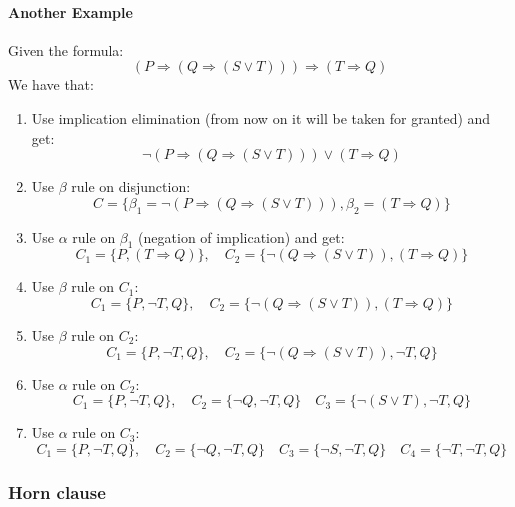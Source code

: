 \documentclass[10pt,a4paper]{article}
\begin{document}
\paragraph{Another Example}
Given the formula:
\[(P\Rightarrow (Q \Rightarrow(S\vee T)))\Rightarrow(T\Rightarrow Q)\]
We have that:
\begin{enumerate}
\item Use implication elimination (from now on it will be taken for granted) and get:
\[\neg(P\Rightarrow (Q \Rightarrow(S\vee T)))\vee(T\Rightarrow Q)\]
\item Use $\beta$ rule on disjunction:
\[C=\lbrace \beta_1= \neg(P\Rightarrow (Q \Rightarrow(S\vee T))),\beta_2=(T\Rightarrow Q)\rbrace\]
\item Use $\alpha$ rule on $\beta_1$ (negation of implication) and get:
\[C_1=\lbrace P,(T\Rightarrow Q)\rbrace,\quad C_2=\lbrace \neg  (Q \Rightarrow(S\vee T)),(T\Rightarrow Q)\rbrace \]
\item Use $\beta$ rule on $C_1$:
\[C_1=\lbrace P,\neg T, Q\rbrace,\quad C_2=\lbrace \neg  (Q \Rightarrow(S\vee T)),(T\Rightarrow Q)\rbrace \]
\item Use $\beta$ rule on $C_2$:
\[C_1=\lbrace P,\neg T, Q\rbrace,\quad C_2=\lbrace \neg  (Q \Rightarrow(S\vee T)),\neg T, Q\rbrace \]
\item Use $\alpha$ rule on $C_2$:
\[C_1=\lbrace P,\neg T, Q\rbrace,\quad C_2=\lbrace \neg  Q ,\neg T, Q\rbrace\quad C_3=\lbrace \neg(S \vee T),\neg T, Q\rbrace \]
\item Use $\alpha$ rule on $C_3$:
\[C_1=\lbrace P,\neg T, Q\rbrace,\quad C_2=\lbrace \neg  Q ,\neg T, Q\rbrace\quad C_3=\lbrace \neg S,\neg T, Q\rbrace\quad C_4=\lbrace \neg T,\neg T, Q\rbrace
\]
\end{enumerate}

\subsubsection{Horn clause}
\label{subsubsec:horn}
\end{document}
